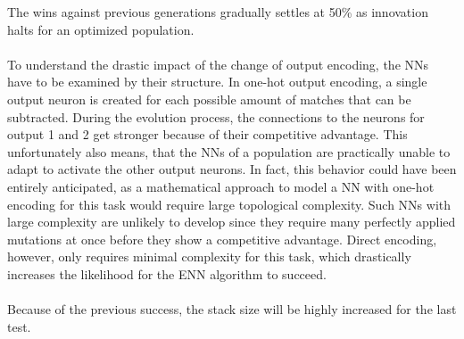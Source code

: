 The wins against previous generations gradually settles at 50\% as innovation halts for an optimized population.
\\ \\
To understand the drastic impact of the change of output encoding, the NNs have to be examined by their structure.
In one-hot output encoding, a single output neuron is created for each possible amount of matches that can be subtracted.
During the evolution process, the connections to the neurons for output 1 and 2 get stronger because of their competitive advantage.
This unfortunately also means, that the NNs of a population are practically unable to adapt to activate the other output neurons.
In fact, this behavior could have been entirely anticipated, as a mathematical approach to model a NN with one-hot encoding for this task would require large topological complexity.
Such NNs with large complexity are unlikely to develop since they require many perfectly applied mutations at once before they show a competitive advantage.
Direct encoding, however, only requires minimal complexity for this task, which drastically increases the likelihood for the ENN algorithm to succeed.
\\\\
Because of the previous success, the stack size will be highly increased for the last test.

